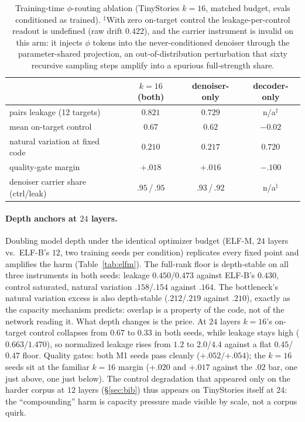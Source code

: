 \documentclass[11pt]{article}
\begin{document}
\begin{table}[h]\centering\small
\begin{tabular}{l ccc}
& $k{=}16$ (both) & denoiser-only & decoder-only \\
\hline
pairs leakage (12 targets)       & $0.821$ & $0.729$ & n/a$^{\ddagger}$ \\
mean on-target control           & $0.67$  & $0.62$  & $-0.02$ \\
natural variation at fixed code  & $0.210$ & $0.217$ & $0.720$ \\
quality-gate margin              & $+.018$ & $+.016$ & $-.100$ \\
denoiser carrier share (ctrl/leak) & $.95$\,/\,$.95$ & $.93$\,/\,$.92$ & n/a$^{\ddagger}$ \\
\end{tabular}
\caption{Training-time $\phi$-routing ablation (TinyStories $k{=}16$,
matched budget, evals conditioned as trained). $^{\ddagger}$With zero
on-target control the leakage-per-control readout is undefined (raw
drift $0.422$), and the carrier instrument is invalid on this arm: it
injects $\phi$ tokens into the never-conditioned denoiser through the
parameter-shared projection, an out-of-distribution perturbation that
sixty recursive sampling steps amplify into a spurious full-strength
share.}
\label{tab:route}
\end{table}

\paragraph{Depth anchors at $24$ layers.} Doubling model depth under the
identical optimizer budget (ELF-M, $24$ layers vs.\ ELF-B's $12$, two
training seeds per condition) replicates every fixed point and
amplifies the harm (Table~\ref{tab:elfm}). The full-rank floor is
depth-stable on all three instruments in both seeds: leakage
$0.450$/$0.473$ against ELF-B's $0.430$, control saturated, natural
variation $.158$/$.154$ against $.164$. The bottleneck's natural
variation excess is also depth-stable ($.212$/$.219$ against $.210$),
exactly as the capacity mechanism predicts: overlap is a property of
the code, not of the network reading it. What depth changes is the
price. At $24$ layers $k{=}16$'s on-target control collapses from
$0.67$ to $0.33$ in both seeds, while leakage stays high
($0.663$/$1.470$), so normalized leakage rises from $1.2$ to
$2.0$/$4.4$ against a flat $0.45$/$0.47$ floor. Quality gates: both M1
seeds pass cleanly ($+.052$/$+.054$); the $k{=}16$ seeds sit at the
familiar $k{=}16$ margin ($+.020$ and $+.017$ against the $.02$ bar,
one just above, one just below). The control degradation that appeared
only on the harder corpus at $12$ layers (\S\ref{sec:bib}) thus appears
on TinyStories itself at $24$: the ``compounding'' harm is capacity
pressure made visible by scale, not a corpus quirk.
\end{document}
